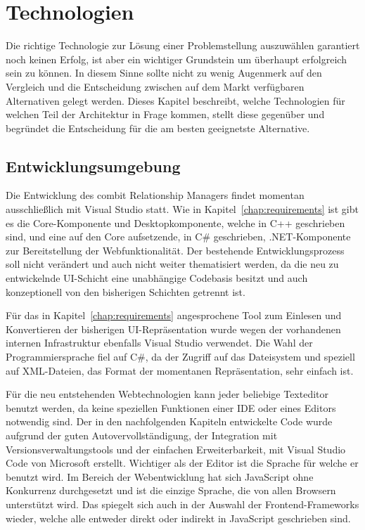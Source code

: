 \chapter{Technologien}\label{chap:technologies}

Die richtige Technologie zur Lösung einer Problemstellung auszuwählen garantiert noch keinen Erfolg, ist aber ein wichtiger Grundstein um überhaupt erfolgreich sein zu können. In diesem Sinne sollte nicht zu wenig Augenmerk auf den Vergleich und die Entscheidung zwischen auf dem Markt verfügbaren Alternativen gelegt werden. Dieses Kapitel beschreibt, welche Technologien für welchen Teil der Architektur in Frage kommen, stellt diese gegenüber und begründet die Entscheidung für die am besten geeignetste Alternative.

\section{Entwicklungsumgebung}
Die Entwicklung des combit Relationship Managers findet momentan ausschließlich mit Visual Studio statt. Wie in Kapitel~\ref{chap:requirements} ist gibt es die Core-Komponente und Desktopkomponente, welche in C++ geschrieben sind, und eine auf den Core aufsetzende, in C\# geschrieben, .NET-Komponente zur Bereitstellung der Webfunktionalität. Der bestehende Entwicklungsprozess soll nicht verändert und auch nicht weiter thematisiert werden, da die neu zu entwickelnde UI-Schicht eine unabhängige Codebasis besitzt und auch konzeptionell von den bisherigen Schichten getrennt ist. 

Für das in Kapitel~\ref{chap:requirements} angesprochene Tool zum Einlesen und Konvertieren der bisherigen UI-Repräsentation wurde wegen der vorhandenen internen Infrastruktur ebenfalls Visual Studio verwendet. Die Wahl der Programmiersprache fiel auf C\#, da der Zugriff auf das Dateisystem und speziell auf XML-Dateien, das Format der momentanen Repräsentation, sehr einfach ist. 

Für die neu entstehenden Webtechnologien kann jeder beliebige Texteditor benutzt werden, da keine speziellen Funktionen einer IDE oder eines Editors notwendig sind. Der in den nachfolgenden Kapiteln entwickelte Code wurde aufgrund der guten Autovervollständigung, der Integration mit Versionsverwaltungstools und der einfachen Erweiterbarkeit, mit Visual Studio Code von Microsoft erstellt. Wichtiger als der Editor ist die Sprache für welche er benutzt wird. Im Bereich der Webentwicklung hat sich JavaScript ohne Konkurrenz durchgesetzt und ist die einzige Sprache, die von allen Browsern unterstützt wird. Das spiegelt sich auch in der Auswahl der Frontend-Frameworks wieder, welche alle entweder direkt oder indirekt in JavaScript geschrieben sind.   

